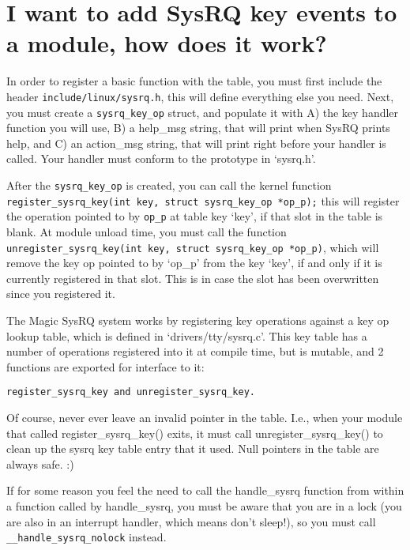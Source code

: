 \documentclass[article,letterpaper]{memoir}
\let\subsection\section
\let\section\chapter
\begin{document}
\subsection{I want to add SysRQ key events to a module, how does it
work?}\label{i-want-to-add-sysrq-key-events-to-a-module-how-does-it-work}

In order to register a basic function with the table, you must first
include the header \texttt{include/linux/sysrq.h}, this will define
everything else you need. Next, you must create a
\texttt{sysrq\_key\_op} struct, and populate it with A) the key handler
function you will use, B) a help\_msg string, that will print when SysRQ
prints help, and C) an action\_msg string, that will print right before
your handler is called. Your handler must conform to the prototype in
`sysrq.h'.

After the \texttt{sysrq\_key\_op} is created, you can call the kernel
function
\texttt{register\_sysrq\_key(int\ key,\ struct\ sysrq\_key\_op\ *op\_p);}
this will register the operation pointed to by \texttt{op\_p} at table
key `key', if that slot in the table is blank. At module unload time,
you must call the function
\texttt{unregister\_sysrq\_key(int\ key,\ struct\ sysrq\_key\_op\ *op\_p)},
which will remove the key op pointed to by `op\_p' from the key `key',
if and only if it is currently registered in that slot. This is in case
the slot has been overwritten since you registered it.

The Magic SysRQ system works by registering key operations against a key
op lookup table, which is defined in `drivers/tty/sysrq.c'. This key
table has a number of operations registered into it at compile time, but
is mutable, and 2 functions are exported for interface to it:

\begin{verbatim}
register_sysrq_key and unregister_sysrq_key.
\end{verbatim}

Of course, never ever leave an invalid pointer in the table. I.e., when
your module that called register\_sysrq\_key() exits, it must call
unregister\_sysrq\_key() to clean up the sysrq key table entry that it
used. Null pointers in the table are always safe. :)

If for some reason you feel the need to call the handle\_sysrq function
from within a function called by handle\_sysrq, you must be aware that
you are in a lock (you are also in an interrupt handler, which means
don't sleep!), so you must call \texttt{\_\_handle\_sysrq\_nolock}
instead.
\end{document}
